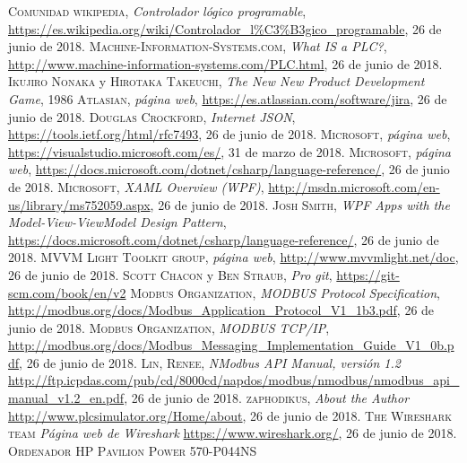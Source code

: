 \documentclass[pdftex,11pt,a4paper]{book}
\begin{document}
\begin{thebibliography}{X}
 \textsc{Comunidad wikipedia},
 \textit{Controlador lógico programable},
 \url{https://es.wikipedia.org/wiki/Controlador_l%C3%B3gico_programable},
  26 de junio de 2018.
 \textsc{Machine-Information-Systems.com},
 \textit{What IS a PLC?},
 \url{http://www.machine-information-systems.com/PLC.html},
  26 de junio de 2018.
 \textsc{Ikujiro Nonaka} y \textsc{Hirotaka Takeuchi},
 \textit{The New New Product Development Game},
 1986
 \textsc{Atlasian},
 \textit{página web},
 \url{https://es.atlassian.com/software/jira},
  26 de junio de 2018.
 \textsc{Douglas Crockford},
 \textit{Internet JSON},
 \url{https://tools.ietf.org/html/rfc7493},
  26 de junio de 2018.
 \textsc{Microsoft},
 \textit{página web},
 \url{https://visualstudio.microsoft.com/es/},
  31 de marzo de 2018.
 \textsc{Microsoft},
 \textit{página web},
 \url{https://docs.microsoft.com/dotnet/csharp/language-reference/},
  26 de junio de 2018.
 \textsc{Microsoft},
 \textit{XAML Overview (WPF)},
 \url{http://msdn.microsoft.com/en-us/library/ms752059.aspx},
  26 de junio de 2018.
 \textsc{Josh Smith},
 \textit{WPF Apps with the Model-View-ViewModel Design Pattern},
 \url{https://docs.microsoft.com/dotnet/csharp/language-reference/},
  26 de junio de 2018.
 \textsc{MVVM Light Toolkit group},
 \textit{página web},
 \url{http://www.mvvmlight.net/doc},
  26 de junio de 2018.
 \textsc{Scott Chacon} y \textsc{Ben Straub},
 \textit{Pro git},
 \url{https://git-scm.com/book/en/v2}
 \textsc{Modbus Organization},
 \textit{MODBUS Protocol Specification},
 \url{http://modbus.org/docs/Modbus_Application_Protocol_V1_1b3.pdf},
  26 de junio de 2018.
 \textsc{Modbus Organization},
 \textit{MODBUS TCP/IP},
 \url{http://modbus.org/docs/Modbus_Messaging_Implementation_Guide_V1_0b.pdf},
  26 de junio de 2018.
 \textsc{Lin, Renee},
 \textit{NModbus API Manual, versión 1.2}
 \url{http://ftp.icpdas.com/pub/cd/8000cd/napdos/modbus/nmodbus/nmodbus_api_manual_v1.2_en.pdf},
  26 de junio de 2018.
 \textsc{zaphodikus},
 \textit{About the Author}
 \url{http://www.plcsimulator.org/Home/about},
  26 de junio de 2018.
 \textsc{The Wireshark team}
 \textit{Página web de Wireshark}
 \url{https://www.wireshark.org/},
  26 de junio de 2018.
 \textsc{Ordenador HP Pavilion Power 570-P044NS}

\end{thebibliography}
\end{document}
